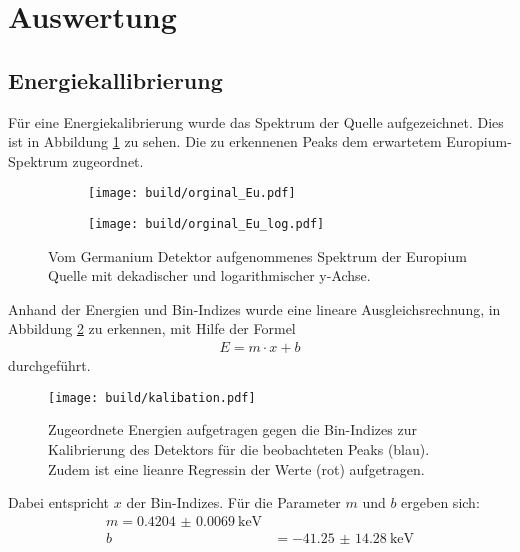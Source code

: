 \newpage
\section{Auswertung}
\label{sec:Auswertung}

\subsection{Energiekallibrierung}
\label{sec:Energiekallibrierung}
Für eine Energiekalibrierung wurde das Spektrum der  Quelle
aufgezeichnet. Dies ist in Abbildung \ref{plt:Eu-Spektrum} zu sehen. Die zu
erkennenen Peaks dem erwartetem Europium-Spektrum zugeordnet.

\begin{figure}[htb]
  \begin{subfigure}{0.5\textwidth}
    \centering
    \texttt{[image: build/orginal\_Eu.pdf]}
  \end{subfigure}
  \begin{subfigure}{0.5\textwidth}
    \centering
    \texttt{[image: build/orginal\_Eu\_log.pdf]}
  \end{subfigure}
  \caption{Vom Germanium Detektor aufgenommenes Spektrum der Europium Quelle mit
  dekadischer und logarithmischer y-Achse.}
  \label{plt:Eu-Spektrum}
\end{figure}

Anhand der Energien und Bin-Indizes wurde eine lineare Ausgleichsrechnung, in
Abbildung \ref{plt:eichung} zu erkennen, mit Hilfe der Formel
\begin{align*}
  E = m \cdot x + b
\end{align*}
durchgeführt.

\begin{figure}[htb]
  \centering
  \texttt{[image: build/kalibation.pdf]}
  \caption{Zugeordnete Energien aufgetragen gegen die Bin-Indizes zur
  Kalibrierung des Detektors für die beobachteten Peaks (blau). Zudem ist eine
  lieanre Regressin der Werte (rot) aufgetragen.}
  \label{plt:eichung}
\end{figure}

Dabei entspricht $x$ der Bin-Indizes. Für die Parameter $m$ und
$b$ ergeben sich:
\begin{align*}
  m = \SI{0.4204(69)}{\kilo\electronvolt} \\
  b &= \SI{-41.25(1428)}{\kilo\electronvolt}
\end{align*}

